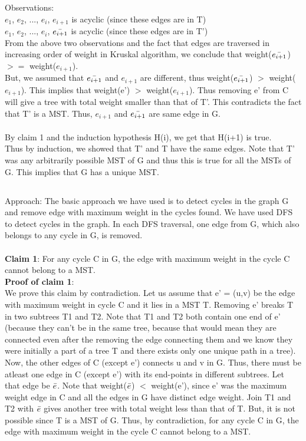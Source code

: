 \documentclass{article}
\begin{document}
Observations:
\\{$e_1$, $e_2$, ..., $e_i$, $e_{i+1}$} is acyclic (since these edges are in T) 
\\{$e_1$, $e_2$, ..., $e_i$, $\Bar{e_{i+1}}$} is acyclic (since these edges are in T')
\\ From the above two observations and the fact that edges are traversed in increasing order of weight in Kruskal algorithm, we conclude that weight($\Bar{e_{i+1}}$) $>=$ weight($e_{i+1}$).
\\But, we assumed that $\Bar{e_{i+1}}$ and $e_{i+1}$ are different, thus weight($\Bar{e_{i+1}}$) $>$ weight($e_{i+1}$).
This implies that weight(e') $>$ weight($e_{i+1}$). Thus removing e' from C will give a tree with total weight smaller than that of T'. This contradicts the fact that T' is a MST. Thus, $e_{i+1}$ and $\Bar{e_{i+1}}$ are same edge in G.
\\
\\
By claim 1 and the induction hypothesis H(i), we get that H(i+1) is true.
\\
Thus by induction, we showed that T' and T have the same edges. Note that T' was any arbitrarily possible MST of G and thus this is true for all the MSTs of G. This implies that G has a unique MST.

\subsection{}
Approach: The basic approach we have used is to detect cycles in the graph G and remove edge with maximum weight in the cycles found. We have used DFS to detect cycles in the graph. In each DFS traversal, one edge from G, which also belongs to any cycle in G, is removed.
\\
\\
\textbf{Claim 1}: For any cycle C in G, the edge with maximum weight in the cycle C cannot belong to a MST.
\\
\textbf{Proof of claim 1}:
\\
We prove this claim by contradiction. Let us assume that e' = (u,v) be the edge with maximum weight in cycle C and it lies in a MST T. Removing e' breaks T in two subtrees T1 and T2. Note that T1 and T2 both contain one end of e' (because they can't be in the same tree, because that would mean they are connected even after the removing the edge connecting them and we know they were initially a part of a tree T and there exists only one unique path in a tree). Now, the other edges of C (except e') connects u and v in G. Thus, there must be atleast one edge in C (except e') with its end-points in different subtrees. Let that edge be $\Bar{e}$. Note that weight($\Bar{e}$) $<$ weight(e'), since e' was the maximum weight edge in C and all the edges in G have distinct edge weight. Join T1 and T2 with $\Bar{e}$ gives another tree with total weight less than that of T. But, it is not possible since T is a MST of G. Thus, by contradiction, for any cycle C in G, the edge with maximum weight in the cycle C cannot belong to a MST.
\\
\end{document}
